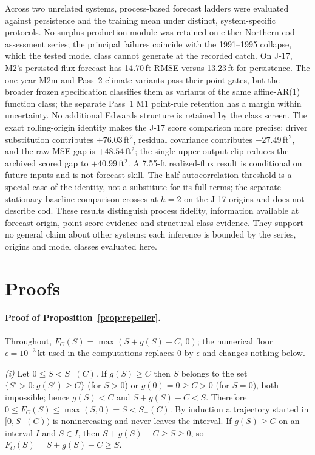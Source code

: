 \documentclass[preprint,11pt,authoryear]{elsarticle}
\theoremstyle{definition}
\theoremstyle{remark}
\newcommand{\kt}{\,\mathrm{kt}}
\begin{document}
Across two unrelated systems, process-based forecast ladders were evaluated against persistence and the training mean under distinct, system-specific protocols. No surplus-production module was retained on either Northern cod assessment series; the principal failures coincide with the 1991--1995 collapse, which the tested model class cannot generate at the recorded catch. On J-17, M2's persisted-flux forecast has 14.70\,ft RMSE versus 13.23\,ft for persistence. The one-year M2m and Pass~2 climate variants pass their point gates, but the broader frozen specification classifies them as variants of the same affine-AR(1) function class; the separate Pass~1 M1 point-rule retention has a margin within uncertainty. No additional Edwards structure is retained by the class screen. The exact rolling-origin identity makes the J-17 score comparison more precise: driver substitution contributes $+76.03$\,ft$^2$, residual covariance contributes $-27.49$\,ft$^2$, and the raw MSE gap is $+48.54$\,ft$^2$; the single upper output clip reduces the archived scored gap to $+40.99$\,ft$^2$. A 7.55-ft realized-flux result is conditional on future inputs and is not forecast skill. The half-autocorrelation threshold is a special case of the identity, not a substitute for its full terms; the separate stationary baseline comparison crosses at $h=2$ on the J-17 origins and does not describe cod. These results distinguish process fidelity, information available at forecast origin, point-score evidence and structural-class evidence. They support no general claim about other systems: each inference is bounded by the series, origins and model classes evaluated here.
\appendix
\FloatBarrier
\section{Proofs}\label{app:proofs}

\paragraph{Proof of Proposition~\ref{prop:repeller}.} Throughout, $F_C(S) = \max(S + g(S) - C,\,0)$; the numerical floor $\epsilon = 10^{-3}\kt$ used in the computations replaces $0$ by $\epsilon$ and changes nothing below.

\emph{(i)} Let $0 \le S < S_-(C)$. If $g(S) \ge C$ then $S$ belongs to the set $\{S'>0 : g(S')\ge C\}$ (for $S>0$) or $g(0)=0\ge C>0$ (for $S=0$), both impossible; hence $g(S) < C$ and $S + g(S) - C < S$. Therefore $0 \le F_C(S) \le \max(S,0) = S < S_-(C)$. By induction a trajectory started in $[0,S_-(C))$ is nonincreasing and never leaves the interval. If $g(S) \ge C$ on an interval $I$ and $S\in I$, then $S + g(S) - C \ge S \ge 0$, so $F_C(S) = S + g(S) - C \ge S$.
\end{document}
